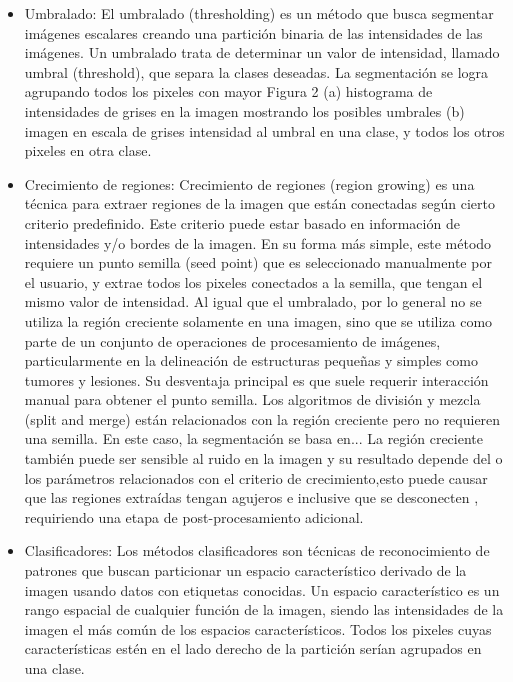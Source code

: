 \begin{itemize}
\item Umbralado: El umbralado (thresholding) es un m\'etodo que busca segmentar im\'agenes
escalares creando una partici\'on binaria de las intensidades de las im\'agenes. Un
umbralado trata de determinar un valor de intensidad, llamado umbral (threshold), que
separa la clases deseadas. La segmentaci\'on se logra agrupando todos los pixeles con mayor
Figura 2 (a) histograma de intensidades de grises en la imagen mostrando los posibles
umbrales (b) imagen en escala de grises intensidad al umbral en una clase, y todos los otros pixeles en otra clase.
\item Crecimiento de regiones: Crecimiento de regiones (region growing) es una t\'ecnica para extraer regiones de la imagen que est\'an conectadas seg\'un cierto criterio predefinido. Este criterio puede estar basado en
informaci\'on de intensidades y/o bordes de la imagen. En su forma más simple, este m\'etodo requiere un punto semilla (seed point) que es seleccionado manualmente por el usuario, y extrae todos los pixeles conectados a la semilla, que tengan el mismo valor de intensidad. Al igual que el umbralado, por lo general no se utiliza la regi\'on creciente solamente en una imagen, sino que se utiliza como parte de un conjunto de operaciones de procesamiento de im\'agenes, particularmente en la delineaci\'on de estructuras pequeñas y simples como tumores y lesiones. Su desventaja principal es que suele requerir interacci\'on manual para obtener el punto semilla. Los algoritmos de divisi\'on y mezcla (split and merge) están relacionados con la regi\'on creciente pero no requieren una semilla. En este caso, la segmentación se basa en... 
La regi\'on creciente tambi\'en puede ser sensible al ruido en la imagen y su resultado depende del o los parámetros relacionados con el criterio de crecimiento,esto puede causar que las regiones extra\'idas tengan agujeros e inclusive que se desconecten , requiriendo una etapa de post-procesamiento adicional.
\item Clasificadores: Los m\'etodos clasificadores son t\'ecnicas de reconocimiento de patrones que buscan particionar un espacio caracter\'istico derivado de la imagen usando datos con etiquetas conocidas. Un espacio caracter\'istico es un rango espacial de cualquier funci\'on de la imagen, siendo las intensidades de la imagen el m\'as com\'un de los espacios caracter\'isticos. Todos los pixeles cuyas caracter\'isticas est\'en en el lado derecho de la partici\'on ser\'ian agrupados en una clase.

\end{itemize}
